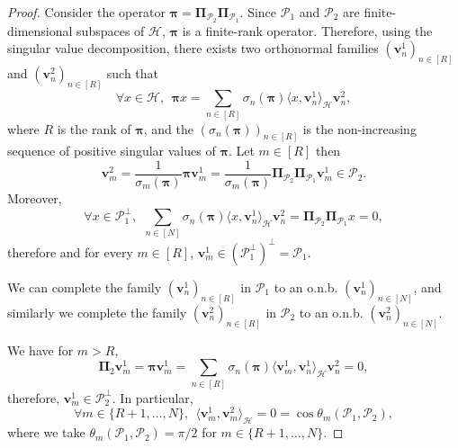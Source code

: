 \documentclass[twoside,11pt]{book}
\numberwithin{theorem}{chapter}
\numberwithin{definition}{chapter}
\numberwithin{proposition}{chapter}
\numberwithin{corollary}{chapter}
\numberwithin{example}{chapter}
\numberwithin{lemma}{chapter}
\numberwithin{assumption}{chapter}
\numberwithin{equation}{chapter}
\numberwithin{figure}{chapter}
\begin{document}
\begin{proof}
Consider the operator $\bm{\pi} = \bm{\Pi}_{\mathcal{P}_2} \bm{\Pi}_{\mathcal{P}_1}$. Since $\mathcal{P}_1$ and $\mathcal{P}_2$ are finite-dimensional subspaces of $\mathcal{H}$, $\bm{\pi}$ is a finite-rank operator. Therefore, using the singular value decomposition, there exists two orthonormal families $(\bm{v}^{1}_{n})_{n \in [R]}$ and $(\bm{v}^{2}_{n})_{n \in [R]}$ such that
\begin{equation}\label{eq:SVD_bmpi}
\forall x \in \mathcal{H}, \:\: \bm{\pi} x = \sum\limits_{n \in [R]} \sigma_{n}(\bm{\pi}) \langle x,\bm{v}^{1}_{n} \rangle_{\mathcal{H}} \bm{v}^{2}_{n},
\end{equation} 
where $R$ is the rank of $\bm{\pi}$, and the $(\sigma_n(\bm{\pi}))_{n \in [R]}$ is the non-increasing sequence of positive singular values of $\bm{\pi}$.
Let $m \in [R]$ then
\begin{equation}
 \bm{v}^{2}_{m} = \frac{1}{\sigma_{m}(\bm{\pi})} \bm{\pi} \bm{v}^{1}_{m} = \frac{1}{\sigma_{m}(\bm{\pi})} \bm{\Pi}_{\mathcal{P}_2} \bm{\Pi}_{\mathcal{P}_1} \bm{v}^{1}_{m} \in \mathcal{P}_2.
\end{equation}
Moreover, 
\begin{equation}
\forall x \in \mathcal{P}_1^{\perp}, \:\: \sum\limits_{n \in [N]} \sigma_{n}(\bm{\pi})\langle x,\bm{v}^{1}_{n} \rangle_{\mathcal{H}}\bm{v}^{2}_{n} = \bm{\Pi}_{\mathcal{P}_2} \bm{\Pi}_{\mathcal{P}_1} x =0,
\end{equation}
therefore
and for every $m \in [R]$, $\bm{v}_{m}^{1} \in (\mathcal{P}_1^{\perp})^{\perp} = \mathcal{P}_1$. 


We can complete the family $(\bm{v}^{1}_n)_{n \in [R]}$ in $\mathcal{P}_{1}$ to an o.n.b. $(\bm{v}_{n}^{1})_{n \in [N]}$, and similarly we complete the family $(\bm{v}^{2}_n)_{n \in [R]}$ in $\mathcal{P}_{2}$ to an o.n.b. $(\bm{v}_{n}^{2})_{n \in [N]}$. 

We have for $m >R$, 
\begin{equation}
\bm{\Pi}_{2} \bm{v}^{1}_{m} = \bm{\pi} \bm{v}^{1}_{m} = \sum\limits_{n \in [R]} \sigma_{n}(\bm{\pi}) \langle \bm{v}^{1}_{m}, \bm{v}^{1}_{n} \rangle_{\mathcal{H}} \bm{v}^{2}_{n} = 0,
\end{equation}
therefore, $\bm{v}^{1}_{m} \in \mathcal{P}_{2}^{\perp}$. In particular,
\begin{equation}
\forall m \in \{R+1, \dots, N \}, \:\: \langle \bm{v}^{1}_{m} ,\bm{v}^{2}_{m} \rangle_{\mathcal{H}} = 0 = \cos \theta_{m}(\mathcal{P}_{1}, \mathcal{P}_2),
\end{equation}
where we take $\theta_{m}(\mathcal{P}_{1}, \mathcal{P}_2) = \pi/2$ for $m \in \{R+1, \dots, N \}$.


\end{proof}
\end{document}

